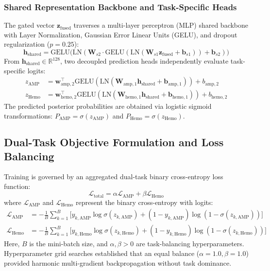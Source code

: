\documentclass[11pt,a4paper]{article}
\begin{document}
\subsubsection{Shared Representation Backbone and Task-Specific Heads}
The gated vector $\mathbf{z}_{\text{fused}}$ traverses a multi-layer perceptron (MLP) shared backbone with Layer Normalization, Gaussian Error Linear Units (GELU), and dropout regularization ($p = 0.25$):
\begin{equation}
    \mathbf{h}_{\text{shared}} = \text{GELU}\big(\text{LN}(\mathbf{W}_{s2} \cdot \text{GELU}(\text{LN}(\mathbf{W}_{s1} \mathbf{z}_{\text{fused}} + \mathbf{b}_{s1})) + \mathbf{b}_{s2})\big)
\end{equation}
From $\mathbf{h}_{\text{shared}} \in \mathbb{R}^{128}$, two decoupled prediction heads independently evaluate task-specific logits:
\begin{align}
    z_{\text{AMP}} &= \mathbf{w}_{\text{amp}, 2}^{\top} \text{GELU}(\text{LN}(\mathbf{W}_{\text{amp}, 1} \mathbf{h}_{\text{shared}} + \mathbf{b}_{\text{amp}, 1})) + b_{\text{amp}, 2} \\
    z_{\text{Hemo}} &= \mathbf{w}_{\text{hemo}, 2}^{\top} \text{GELU}(\text{LN}(\mathbf{W}_{\text{hemo}, 1} \mathbf{h}_{\text{shared}} + \mathbf{b}_{\text{hemo}, 1})) + b_{\text{hemo}, 2}
\end{align}
The predicted posterior probabilities are obtained via logistic sigmoid transformations: $P_{\text{AMP}} = \sigma(z_{\text{AMP}})$ and $P_{\text{Hemo}} = \sigma(z_{\text{Hemo}})$.

\subsection{Dual-Task Objective Formulation and Loss Balancing}
Training is governed by an aggregated dual-task binary cross-entropy loss function:
\begin{equation}
    \mathcal{L}_{\text{total}} = \alpha \mathcal{L}_{\text{AMP}} + \beta \mathcal{L}_{\text{Hemo}}
\end{equation}
where $\mathcal{L}_{\text{AMP}}$ and $\mathcal{L}_{\text{Hemo}}$ represent the binary cross-entropy with logits:
\begin{align}
    \mathcal{L}_{\text{AMP}} &= - \frac{1}{B} \sum_{k=1}^B \big[ y_{k, \text{AMP}} \log \sigma(z_{k, \text{AMP}}) + (1 - y_{k, \text{AMP}}) \log (1 - \sigma(z_{k, \text{AMP}})) \big] \\
    \mathcal{L}_{\text{Hemo}} &= - \frac{1}{B} \sum_{k=1}^B \big[ y_{k, \text{Hemo}} \log \sigma(z_{k, \text{Hemo}}) + (1 - y_{k, \text{Hemo}}) \log (1 - \sigma(z_{k, \text{Hemo}})) \big]
\end{align}
Here, $B$ is the mini-batch size, and $\alpha, \beta > 0$ are task-balancing hyperparameters. Hyperparameter grid searches established that an equal balance ($\alpha = 1.0, \beta = 1.0$) provided harmonic multi-gradient backpropagation without task dominance.
\end{document}
